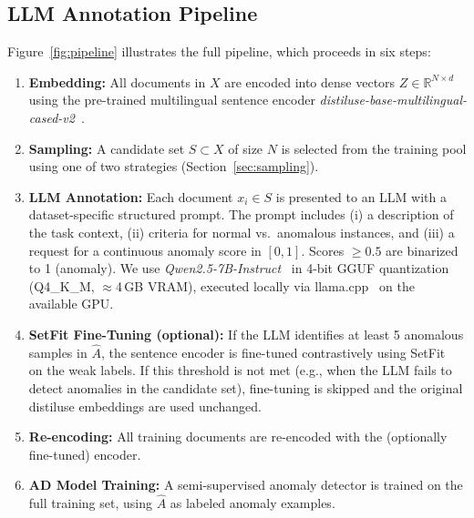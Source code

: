 \documentclass[12pt]{article}
\begin{document}
\subsection{LLM Annotation Pipeline}

Figure~\ref{fig:pipeline} illustrates the full pipeline, which proceeds in six steps:

\begin{enumerate}
    \item \textbf{Embedding:} All documents in $X$ are encoded into dense vectors 
          $Z \in \mathbb{R}^{N \times d}$ using the pre-trained multilingual sentence 
          encoder \textit{distiluse-base-multilingual-cased-v2}~\cite{reimers2019sentence}.
    \item \textbf{Sampling:} A candidate set $S \subset X$ of size $N$ is selected 
          from the training pool using one of two strategies (Section~\ref{sec:sampling}).
    \item \textbf{LLM Annotation:} Each document $x_i \in S$ is presented to an 
          LLM with a dataset-specific structured prompt. The prompt includes 
          (i) a description of the task context, (ii) criteria for normal vs.\ 
          anomalous instances, and (iii) a request for a continuous anomaly score 
          in $[0, 1]$. Scores $\geq 0.5$ are binarized to 1 (anomaly). 
          We use \textit{Qwen2.5-7B-Instruct}~\cite{qwen2025} in 4-bit GGUF
          quantization (Q4\_K\_M, $\approx$4\,GB VRAM), executed locally via
          llama.cpp~\cite{llamacpp} on the available GPU.
    \item \textbf{SetFit Fine-Tuning (optional):} If the LLM identifies at least 5 
          anomalous samples in $\hat{A}$, the sentence encoder is fine-tuned 
          contrastively using SetFit~\cite{tunstall2022efficient} on the weak labels. 
          If this threshold is not met (e.g., when the LLM fails to detect 
          anomalies in the candidate set), fine-tuning is skipped and the 
          original distiluse embeddings are used unchanged.
    \item \textbf{Re-encoding:} All training documents are re-encoded with the 
          (optionally fine-tuned) encoder.
    \item \textbf{AD Model Training:} A semi-supervised anomaly detector is trained 
          on the full training set, using $\hat{A}$ as labeled anomaly examples.
\end{enumerate}

\end{document}
